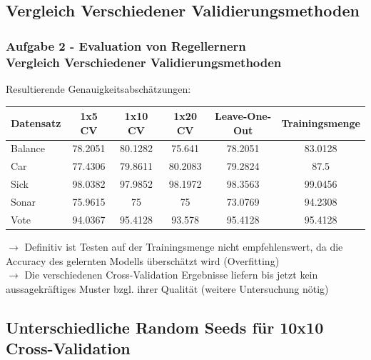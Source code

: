 \documentclass[accentcolor=tud6b,colorbacktitle,inverttitle,landscape,german,presentation,t]{tudbeamer}
\begin{document}
    \subsection{Vergleich Verschiedener Validierungsmethoden}
    
    \begin{frame}[t]
    \frametitle{Aufgabe 2 - Evaluation von Regellernern\\ Vergleich Verschiedener Validierungsmethoden}
        Resultierende Genauigkeitsabschätzungen:
        \vfill
        \begin{tabular}[htbp]{l||c|c|c|c|c}
            Datensatz & 1x5 CV & 1x10 CV & 1x20 CV & Leave-One-Out & Trainingsmenge \\
            \hline
            \hline
            Balance & 78.2051 & 80.1282 & 75.641 & 78.2051 & 83.0128 \\
            \hline
            Car & 77.4306 & 79.8611 & 80.2083 & 79.2824 & 87.5 \\
            \hline
            Sick & 98.0382 & 97.9852 & 98.1972 & 98.3563 & 99.0456 \\
            \hline
            Sonar & 75.9615 & 75 & 75 & 73.0769 & 94.2308 \\
            \hline
            Vote & 94.0367 & 95.4128 & 93.578 & 95.4128 & 95.4128 \\
        \end{tabular}
        \vfill
        $\rightarrow$ Definitiv ist Testen auf der Trainingsmenge nicht empfehlenswert, da die Accuracy des gelernten Modells überschätzt wird (Overfitting)\\
        $\rightarrow$ Die verschiedenen Cross-Validation Ergebnisse liefern bis jetzt kein aussagekräftiges Muster bzgl. ihrer Qualität (weitere Untersuchung nötig)
    \end{frame}
    
    \subsection{Unterschiedliche Random Seeds für 10x10 Cross-Validation}
    
\end{document}
